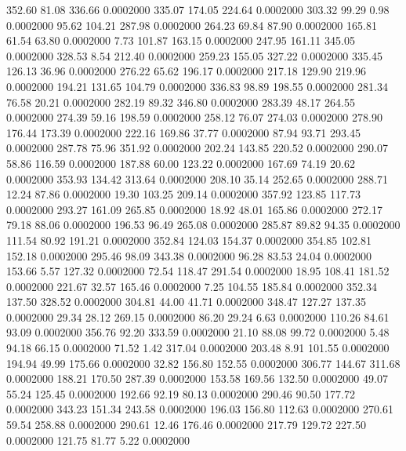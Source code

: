 352.60   81.08  336.66   0.0002000
 335.07  174.05  224.64   0.0002000
 303.32   99.29    0.98   0.0002000
  95.62  104.21  287.98   0.0002000
 264.23   69.84   87.90   0.0002000
 165.81   61.54   63.80   0.0002000
   7.73  101.87  163.15   0.0002000
 247.95  161.11  345.05   0.0002000
 328.53    8.54  212.40   0.0002000
 259.23  155.05  327.22   0.0002000
 335.45  126.13   36.96   0.0002000
 276.22   65.62  196.17   0.0002000
 217.18  129.90  219.96   0.0002000
 194.21  131.65  104.79   0.0002000
 336.83   98.89  198.55   0.0002000
 281.34   76.58   20.21   0.0002000
 282.19   89.32  346.80   0.0002000
 283.39   48.17  264.55   0.0002000
 274.39   59.16  198.59   0.0002000
 258.12   76.07  274.03   0.0002000
 278.90  176.44  173.39   0.0002000
 222.16  169.86   37.77   0.0002000
  87.94   93.71  293.45   0.0002000
 287.78   75.96  351.92   0.0002000
 202.24  143.85  220.52   0.0002000
 290.07   58.86  116.59   0.0002000
 187.88   60.00  123.22   0.0002000
 167.69   74.19   20.62   0.0002000
 353.93  134.42  313.64   0.0002000
 208.10   35.14  252.65   0.0002000
 288.71   12.24   87.86   0.0002000
  19.30  103.25  209.14   0.0002000
 357.92  123.85  117.73   0.0002000
 293.27  161.09  265.85   0.0002000
  18.92   48.01  165.86   0.0002000
 272.17   79.18   88.06   0.0002000
 196.53   96.49  265.08   0.0002000
 285.87   89.82   94.35   0.0002000
 111.54   80.92  191.21   0.0002000
 352.84  124.03  154.37   0.0002000
 354.85  102.81  152.18   0.0002000
 295.46   98.09  343.38   0.0002000
  96.28   83.53   24.04   0.0002000
 153.66    5.57  127.32   0.0002000
  72.54  118.47  291.54   0.0002000
  18.95  108.41  181.52   0.0002000
 221.67   32.57  165.46   0.0002000
   7.25  104.55  185.84   0.0002000
 352.34  137.50  328.52   0.0002000
 304.81   44.00   41.71   0.0002000
 348.47  127.27  137.35   0.0002000
  29.34   28.12  269.15   0.0002000
  86.20   29.24    6.63   0.0002000
 110.26   84.61   93.09   0.0002000
 356.76   92.20  333.59   0.0002000
  21.10   88.08   99.72   0.0002000
   5.48   94.18   66.15   0.0002000
  71.52    1.42  317.04   0.0002000
 203.48    8.91  101.55   0.0002000
 194.94   49.99  175.66   0.0002000
  32.82  156.80  152.55   0.0002000
 306.77  144.67  311.68   0.0002000
 188.21  170.50  287.39   0.0002000
 153.58  169.56  132.50   0.0002000
  49.07   55.24  125.45   0.0002000
 192.66   92.19   80.13   0.0002000
 290.46   90.50  177.72   0.0002000
 343.23  151.34  243.58   0.0002000
 196.03  156.80  112.63   0.0002000
 270.61   59.54  258.88   0.0002000
 290.61   12.46  176.46   0.0002000
 217.79  129.72  227.50   0.0002000
 121.75   81.77    5.22   0.0002000
